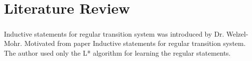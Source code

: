 \chapter{Literature Review}\label{chapter:literature_review}

\paragraph{}
Inductive statements for regular transition system was introduced by Dr. Welzel-Mohr.
Motivated from paper Inductive statements for regular transition system.
The author used only the L* algorithm for learning the regular statements.
